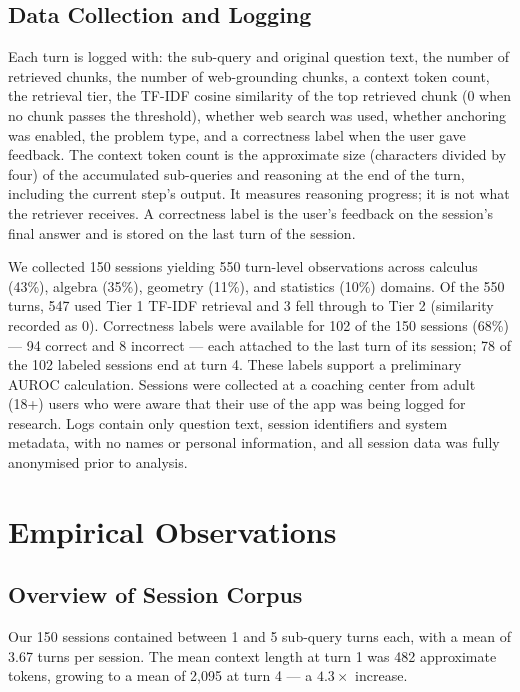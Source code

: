 \documentclass[11pt,a4paper]{article}
\begin{document}
\subsection{Data Collection and Logging}
Each turn is logged with: the sub-query and original question text, the number of retrieved chunks, the number
of web-grounding chunks, a context token count, the retrieval tier, the TF-IDF cosine similarity of the top
retrieved chunk (0 when no chunk passes the threshold), whether web search was used, whether anchoring was
enabled, the problem type, and a correctness label when the user gave feedback. The context token count is the
approximate size (characters divided by four) of the accumulated sub-queries and reasoning at the end of the
turn, including the current step's output. It measures reasoning progress; it is not what the retriever receives.
A correctness label is the user's feedback on the session's final answer and is stored on the last turn of the
session.

We collected 150 sessions yielding 550 turn-level observations across calculus (43\%), algebra (35\%),
geometry (11\%), and statistics (10\%) domains. Of the 550 turns, 547 used Tier 1 TF-IDF retrieval and 3 fell
through to Tier 2 (similarity recorded as 0). Correctness labels were available for 102 of the 150 sessions
(68\%) --- 94 correct and 8 incorrect --- each attached to the last turn of its session; 78 of the 102 labeled
sessions end at turn 4. These labels support a preliminary AUROC calculation. Sessions were collected at a
coaching center from adult (18+) users who were aware that their use of the app was being logged for
research. Logs contain only question text, session identifiers and system metadata, with no names or
personal information, and all session data was fully anonymised prior to analysis.

\section{Empirical Observations}

\subsection{Overview of Session Corpus}
Our 150 sessions contained between 1 and 5 sub-query turns each, with a mean of 3.67 turns per session. The
mean context length at turn 1 was 482 approximate tokens, growing to a mean of 2,095 at turn 4 --- a
$4.3\times$ increase.
\end{document}
